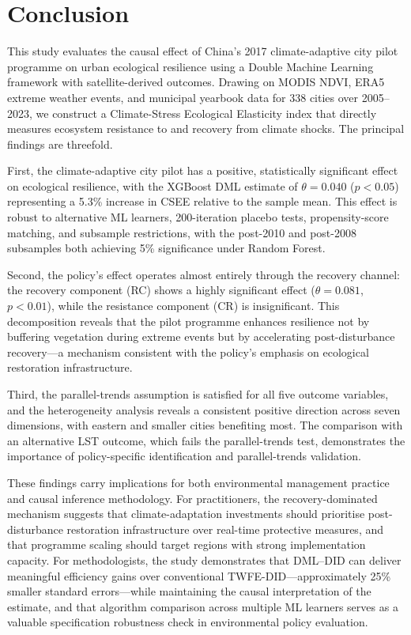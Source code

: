 \section{Conclusion}
\label{sec:conclusion}

This study evaluates the causal effect of China's 2017
climate-adaptive city pilot programme on urban ecological resilience
using a Double Machine Learning framework with satellite-derived
outcomes. Drawing on MODIS NDVI, ERA5 extreme weather events, and
municipal yearbook data for 338 cities over 2005--2023, we construct
a Climate-Stress Ecological Elasticity index that directly measures
ecosystem resistance to and recovery from climate shocks. The
principal findings are threefold.

First, the climate-adaptive city pilot has a positive, statistically
significant effect on ecological resilience, with the XGBoost DML
estimate of $\theta = 0.040$ ($p < 0.05$) representing a 5.3\%
increase in CSEE relative to the sample mean. This effect is robust
to alternative ML learners, 200-iteration placebo tests, propensity-score
matching, and subsample restrictions, with the post-2010 and post-2008
subsamples both achieving 5\% significance under Random Forest.

Second, the policy's effect operates almost entirely through the
recovery channel: the recovery component (RC) shows a highly
significant effect ($\theta = 0.081$, $p < 0.01$), while the
resistance component (CR) is insignificant. This decomposition
reveals that the pilot programme enhances resilience not by buffering
vegetation during extreme events but by accelerating post-disturbance
recovery---a mechanism consistent with the policy's emphasis on
ecological restoration infrastructure.

Third, the parallel-trends assumption is satisfied for all five
outcome variables, and the heterogeneity analysis reveals a
consistent positive direction across seven dimensions, with eastern
and smaller cities benefiting most. The comparison with an
alternative LST outcome, which fails the parallel-trends test,
demonstrates the importance of policy-specific identification and
parallel-trends validation.

These findings carry implications for both environmental management
practice and causal inference methodology. For practitioners, the
recovery-dominated mechanism suggests that climate-adaptation
investments should prioritise post-disturbance restoration
infrastructure over real-time protective measures, and that programme
scaling should target regions with strong implementation capacity.
For methodologists, the study demonstrates that DML--DID can deliver
meaningful efficiency gains over conventional TWFE-DID---approximately
25\% smaller standard errors---while maintaining the causal
interpretation of the estimate, and that algorithm comparison across
multiple ML learners serves as a valuable specification robustness
check in environmental policy evaluation.

